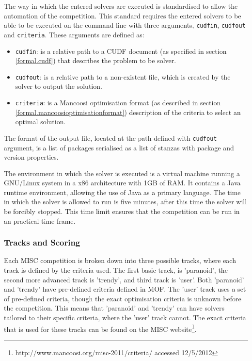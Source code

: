 The way in which the entered solvers are executed is standardised to allow the automation of the competition.
This standard requires the entered solvers to be able to be executed on the command line with three arguments, \verb+cudfin+, \verb+cudfout+ and \verb+criteria+.
These arguments are defined as:
\begin{itemize}
  \item \verb+cudfin+: is a relative path to a CUDF document (as specified in section \ref{formal.cudf}) that describes the problem to be solver.
  \item \verb+cudfout+: is a relative path to a non-existent file, which is created by the solver to output the solution.
  \item \verb+criteria+: is a Mancoosi optimisation format (as described in section \ref{formal.mancoosioptimisationformat}) description of the criteria to select an optimal solution. 
\end{itemize}
The format of the output file, located at the path defined with \verb+cudfout+ argument, is a list of packages serialised as a list of stanzas with package and version properties.

The environment in which the solver is executed is a virtual machine running a GNU/Linux system in a x86 architecture with 1GB of RAM.
It contains a Java runtime environment, allowing the use of Java as a primary language.
The time in which the solver is allowed to run is five minutes, after this time the solver will be forcibly stopped.
This time limit ensures that the competition can be run in an practical time frame.

\subsubsection{Tracks and Scoring}
Each MISC competition is broken down into three possible tracks, where each track is defined by the criteria used.
The first basic track, is 'paranoid', the second more advanced track is 'trendy', and third track is 'user'.
Both 'paranoid' and 'trendy' have pre-defined criteria defined in MOF.
The 'user' track uses a set of pre-defined criteria, though the exact optimisation criteria is unknown before the competition.
This means that 'paranoid' and 'trendy' can have solvers tailored to their specific criteria, where the 'user' track cannot.
The exact criteria that is used for these tracks can be found on the MISC website\footnote{http://www.mancoosi.org/misc-2011/criteria/ accessed 12/5/2012}.

